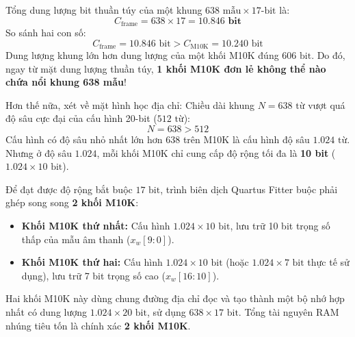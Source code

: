 Tổng dung lượng bit thuần túy của một khung $638\text{ mẫu} \times 17\text{-bit}$ là:
\begin{equation}
C_{\text{frame}} = 638 \times 17 = \mathbf{10.846\text{ bit}}
\end{equation}
So sánh hai con số:
\begin{equation}
C_{\text{frame}} = 10.846\text{ bit} > C_{\text{M10K}} = 10.240\text{ bit}
\end{equation}
Dung lượng khung lớn hơn dung lượng của một khối M10K đúng $606\text{ bit}$. Do đó, ngay từ mặt dung lượng thuần túy, \textbf{1 khối M10K đơn lẻ không thể nào chứa nổi khung 638 mẫu}!

Hơn thế nữa, xét về mặt hình học địa chỉ: Chiều dài khung $N = 638\text{ từ}$ vượt quá độ sâu cực đại của cấu hình 20-bit ($512\text{ từ}$):
\begin{equation}
N = 638 > 512
\end{equation}
Cấu hình có độ sâu nhỏ nhất lớn hơn $638$ trên M10K là cấu hình độ sâu $1.024\text{ từ}$. Nhưng ở độ sâu $1.024$, mỗi khối M10K chỉ cung cấp độ rộng tối đa là \textbf{10 bit} ($1.024 \times 10\text{ bit}$).

Để đạt được độ rộng bắt buộc $17\text{ bit}$, trình biên dịch Quartus Fitter buộc phải ghép song song \textbf{2 khối M10K}:
\begin{itemize}[leftmargin=1.5em, itemsep=2pt]
    \item \textbf{Khối M10K thứ nhất:} Cấu hình $1.024 \times 10\text{ bit}$, lưu trữ 10 bit trọng số thấp của mẫu âm thanh ($x_w[9:0]$).
    \item \textbf{Khối M10K thứ hai:} Cấu hình $1.024 \times 10\text{ bit}$ (hoặc $1.024 \times 7\text{ bit}$ thực tế sử dụng), lưu trữ 7 bit trọng số cao ($x_w[16:10]$).
\end{itemize}
Hai khối M10K này dùng chung đường địa chỉ đọc và tạo thành một bộ nhớ hợp nhất có dung lượng $1.024 \times 20\text{ bit}$, sử dụng $638 \times 17\text{ bit}$. Tổng tài nguyên RAM nhúng tiêu tốn là chính xác \textbf{2 khối M10K}.


